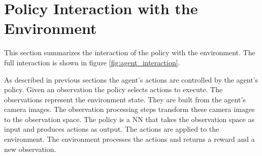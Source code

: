 
\section{Policy Interaction with the Environment}

This section summarizes the interaction of the policy with the environment. The full interaction is shown in figure \ref{fig:agent_interaction}.

As described in previous sections the agent's actions are controlled by the agent's policy. Given an observation the policy selects actions to execute. The observations represent the environment state. They are built from the agent's camera images. The observation processing steps transform these camera images to the observation space. The policy is a \ac{NN} that takes the observation space as input and produces actions as output. 
The actions are applied to the environment. The environment processes the actions and returns a reward and a new observation.



\newcommand{\preprocessedImg}[1]{\texttt{[image: Bilder/image\_printer\_images/agent\_interaction/step\_\#1.png]}}
\newcommand{\observationStack}{\texttt{[image: Bilder/observation\_stack.png]}}


\newcommand\yOffsetHalf{-4}
\newcommand\yOffset{-8}

\newcommand\xOffset{0.5}


